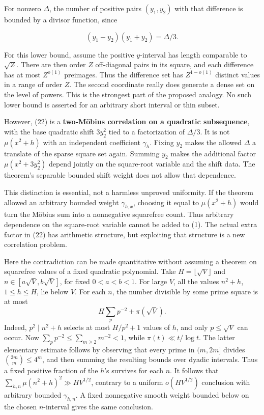 For nonzero \(\Delta\), the number of positive pairs \((y_1,y_2)\) with
that difference is bounded by a divisor function, since

\[
(y_1-y_2)(y_1+y_2)=\Delta/3.
\]

For this lower bound, assume the positive \(y\)-interval has length
comparable to \(\sqrt Z\). There are then order \(Z\) off-diagonal
pairs in its square, and each
difference has at most \(Z^{o(1)}\) preimages. Thus the difference set
has \(Z^{1-o(1)}\) distinct values in a range of order \(Z\). The second
coordinate really does generate a dense set on the level of powers. This
is the strongest part of the proposed analogy. No such lower bound
is asserted for an arbitrary short interval or thin subset.

However, (22) is a \textbf{two-Möbius correlation on a quadratic
subsequence}, with the base quadratic shift \(3y_2^2\) tied to a
factorization of \(\Delta/3\). It is not \(\mu(x^2+h)\) with an
independent coefficient \(\gamma_h\). Fixing \(y_2\) makes the allowed
\(\Delta\) a translate of the sparse square set again. Summing \(y_2\)
makes the additional factor \(\mu(x^2+3y_2^2)\) depend jointly on the
square-root variable and the shift data. The theorem's separable bounded
shift weight does not allow that dependence.

This distinction is essential, not a harmless unproved uniformity. If
the theorem allowed an arbitrary bounded weight \(\gamma_{h,x}\),
choosing it equal to \(\mu(x^2+h)\) would turn the Möbius sum into a
nonnegative squarefree count. Thus arbitrary dependence on the
square-root variable cannot be added to (1). The actual extra factor in
(22) has arithmetic structure, but exploiting that structure is a new
correlation problem.

Here the contradiction can be made quantitative without assuming
a theorem on squarefree values of a fixed quadratic polynomial.
Take \(H=\lfloor\sqrt V\rfloor\) and
\(n\in[a\sqrt V,b\sqrt V]\), for fixed \(0<a<b<1\).
For large \(V\), all the values \(n^2+h\), \(1\le h\le H\), lie below \(V\).
For each \(n\), the number divisible by some prime square is at most
\[
 H\sum_p p^{-2}+\pi(\sqrt V).
\]
Indeed, \(p^2\mid n^2+h\) selects at most \(H/p^2+1\) values of \(h\),
and only \(p\le\sqrt V\) can occur.
Now \(\sum_p p^{-2}\le\sum_{m\ge2}m^{-2}<1\), while
\(\pi(t)\ll t/\log t\).
The latter elementary estimate follows by observing that every prime
in \((m,2m]\) divides \(\binom{2m}{m}\le4^m\), and then summing
the resulting bounds over dyadic intervals.
Thus a fixed positive fraction of the \(h\)'s survives for each \(n\).
It follows that
\(\sum_{h,n}\mu(n^2+h)^2\gg HV^{1/2}\), contrary to a uniform
\(o(HV^{1/2})\) conclusion with arbitrary bounded
\(\gamma_{h,n}\). A fixed nonnegative smooth weight bounded below
on the chosen \(n\)-interval gives the same conclusion.

